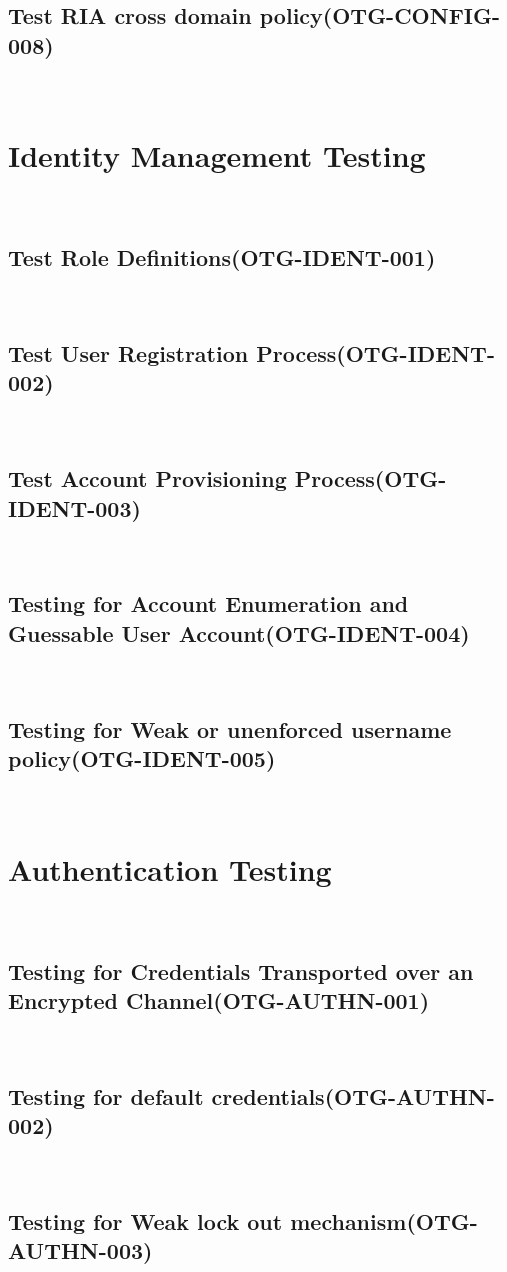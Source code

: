 \documentclass[headsepline,footsepline,footinclude=false,oneside,fontsize=11pt,paper=a4,listof=totoc,bibliography=totoc]{scrbook} %
\begin{document}
\pagebreak 
\subsection{Test RIA cross domain policy(OTG-CONFIG-008)}\

 
\pagebreak 

 
\pagebreak 
\section{Identity Management Testing}\
\subsection{Test Role Definitions(OTG-IDENT-001)}\
\pagebreak 
\subsection{Test User Registration Process(OTG-IDENT-002)}\
\pagebreak 
\subsection{Test Account Provisioning Process(OTG-IDENT-003)}\
\pagebreak 
\subsection{Testing for Account Enumeration and Guessable User Account(OTG-IDENT-004)}\
\pagebreak 
\subsection{Testing for Weak or unenforced username policy(OTG-IDENT-005)}\
 
\pagebreak 
\section{Authentication Testing}\
\subsection{Testing for Credentials Transported over an Encrypted Channel(OTG-AUTHN-001)}\
\pagebreak 
\subsection{Testing for default credentials(OTG-AUTHN-002)}\
\pagebreak 
\subsection{Testing for Weak lock out mechanism(OTG-AUTHN-003)}\
\pagebreak 
\end{document}
